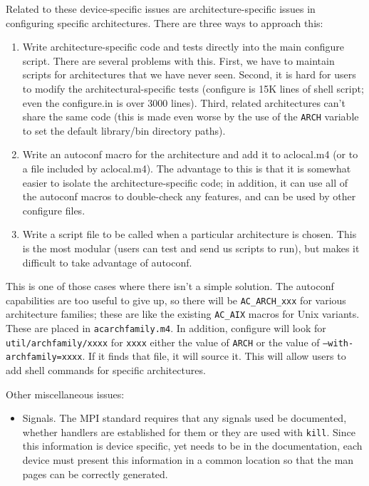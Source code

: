 \documentclass{article}
\let\file=\texttt
\let\code=\texttt
\begin{document}
Related to these device-specific issues are architecture-specific issues in
configuring specific architectures.  There are three ways to approach this:
\begin{enumerate}
\item Write architecture-specific code and tests directly into the main
  configure script.  There are several problems with this.  First, we have to
  maintain scripts for architectures that we have never seen.  Second, it is
  hard for users to modify the architectural-specific tests (configure is 15K
  lines of shell script; even the configure.in is over 3000 lines).  Third, 
  related architectures can't share the same code (this is made even worse by
  the use of the \texttt{ARCH} variable to set the default library/bin
  directory paths).
\item Write an autoconf macro for the architecture and add it to aclocal.m4
  (or to a file included by aclocal.m4).  The advantage to this is that 
  it is somewhat easier to isolate the architecture-specific code; in
  addition, it can use all of the autoconf macros to double-check any
  features, and can be used by other configure files.  
\item Write a script file to be called when a particular architecture is
  chosen.  This is the most modular (users can test and send us scripts to
  run), but makes it difficult to take advantage of autoconf.  
\end{enumerate}
This is one of those cases where there isn't a simple solution.  The autoconf
capabilities are too useful to give up, so there will be \code{AC\_ARCH\_xxx}
for various architecture families; these are like the existing \code{AC\_AIX}
macros for Unix variants.  These are placed in \file{acarchfamily.m4}. 
In addition, configure will look for
\file{util/archfamily/xxxx} for \code{xxxx} either the value of \code{ARCH} or
the value of \code{--with-archfamily=xxxx}.  If it finds that file, it will
source it.  This will allow users to add shell commands for specific
architectures. 

Other miscellaneous issues:
\begin{itemize}
\item Signals.  The MPI standard requires that any signals used be
  documented, whether handlers are established for them or they are used with
  \code{kill}.  Since this information is device specific, yet needs to be in
  the documentation, each device must present this information in a common
  location so that the man pages can be correctly generated.
\end{itemize}
\end{document}
